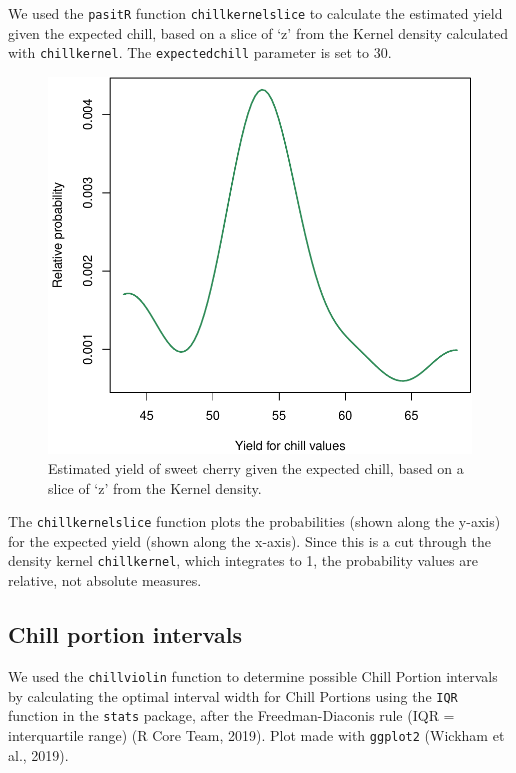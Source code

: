 \documentclass[]{article}
\begin{document}
We used the \texttt{pasitR} function \texttt{chillkernelslice} to
calculate the estimated yield given the expected chill, based on a slice
of `z' from the Kernel density calculated with \texttt{chillkernel}. The
\texttt{expectedchill} parameter is set to 30.

\begin{figure}
\centering
\includegraphics{Chill_Yield_Qta_data_files/figure-latex/unnamed-chunk-4-1.pdf}
\caption{Estimated yield of sweet cherry given the expected chill, based
on a slice of `z' from the Kernel density.}
\end{figure}

The \texttt{chillkernelslice} function plots the probabilities (shown
along the y-axis) for the expected yield (shown along the x-axis). Since
this is a cut through the density kernel \texttt{chillkernel}, which
integrates to 1, the probability values are relative, not absolute
measures.

\hypertarget{chill-portion-intervals}{%
\subsection{Chill portion intervals}\label{chill-portion-intervals}}

We used the \texttt{chillviolin} function to determine possible Chill
Portion intervals by calculating the optimal interval width for Chill
Portions using the \texttt{IQR} function in the \texttt{stats} package,
after the Freedman-Diaconis rule (IQR = interquartile range) (R Core
Team, 2019). Plot made with \texttt{ggplot2} (Wickham et al., 2019).
\end{document}
